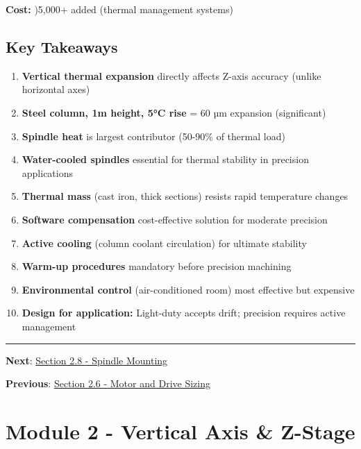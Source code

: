 \documentclass[
]{article}
\providecommand{\tightlist}{%
  \setlength{\itemsep}{0pt}\setlength{\parskip}{0pt}}
\begin{document}
\textbf{Cost:} )5,000+ added (thermal management systems)

\subsection{Key Takeaways}\label{key-takeaways-3}

\begin{enumerate}
\def\labelenumi{\arabic{enumi}.}
\tightlist
\item
  \textbf{Vertical thermal expansion} directly affects Z-axis accuracy
  (unlike horizontal axes)
\item
  \textbf{Steel column, 1m height, 5°C rise} = 60 µm expansion
  (significant)
\item
  \textbf{Spindle heat} is largest contributor (50-90\% of thermal load)
\item
  \textbf{Water-cooled spindles} essential for thermal stability in
  precision applications
\item
  \textbf{Thermal mass} (cast iron, thick sections) resists rapid
  temperature changes
\item
  \textbf{Software compensation} cost-effective solution for moderate
  precision
\item
  \textbf{Active cooling} (column coolant circulation) for ultimate
  stability
\item
  \textbf{Warm-up procedures} mandatory before precision machining
\item
  \textbf{Environmental control} (air-conditioned room) most effective
  but expensive
\item
  \textbf{Design for application:} Light-duty accepts drift; precision
  requires active management
\end{enumerate}

\begin{center}\rule{0.5\linewidth}{0.5pt}\end{center}

\textbf{Next}: \href{section-2.8-spindle-mounting.md}{Section 2.8 -
Spindle Mounting}

\textbf{Previous}: \href{section-2.6-motor-drive-sizing.md}{Section 2.6
- Motor and Drive Sizing}

\newpage

\section{Module 2 - Vertical Axis \&
Z-Stage}\label{module-2---vertical-axis-z-stage-5}
\end{document}

